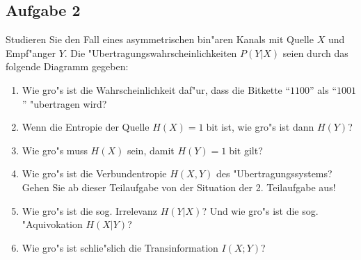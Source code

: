\documentclass[10pt,oneside,onecolumn,a4paper,german,titlepage]{article}
\begin{document}
\subsection*{Aufgabe 2}
Studieren Sie den Fall eines asymmetrischen bin"aren Kanals mit Quelle $X$ und
Empf"anger $Y$. Die "Ubertragungswahrscheinlichkeiten $P(Y|X)$ seien durch das
folgende Diagramm gegeben:
\begin{center}
\end{center}
\begin{enumerate}
\item Wie gro"s ist die Wahrscheinlichkeit daf"ur, dass die Bitkette ``$1100$'' als
``$1001$'' "ubertragen wird?
\item Wenn die Entropie der Quelle $H(X) = 1 \; \mbox{bit}$ ist, wie gro"s ist dann
$H(Y)$?
\item Wie gro"s muss $H(X)$ sein, damit $H(Y) = 1 \; \mbox{bit}$ gilt?
\item Wie gro"s ist die Verbundentropie $H(X,Y)$ des "Ubertragungssystems? Gehen Sie
ab dieser Teilaufgabe von der Situation der 2. Teilaufgabe aus!
\item Wie gro"s ist die sog. Irrelevanz $H(Y|X)$? Und wie gro"s ist die sog.
"Aquivokation $H(X|Y)$?
\item Wie gro"s ist schlie"slich die Transinformation $I(X;Y)$?
\end{enumerate}

\newpage
\end{document}
